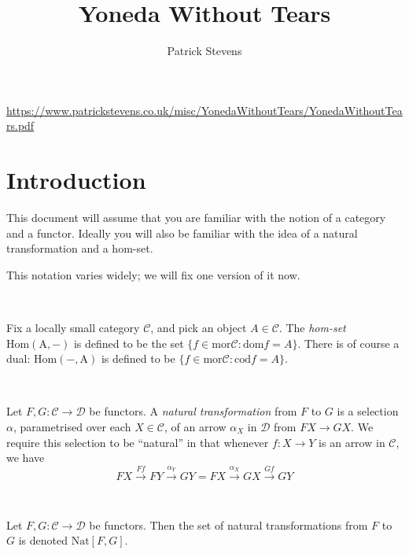 \documentclass[11pt]{amsart}
\title{Yoneda Without Tears}
\author{Patrick Stevens}
\newcommand{\homfrom}[1]{\mathrm{Hom\left(#1, -\right)}}
\newcommand{\homto}[1]{\mathrm{Hom\left(-,#1\right)}}
\newcommand{\Nat}{\mathrm{Nat}}
\begin{document}
    \maketitle

    \tiny \begin{center} \url{https://www.patrickstevens.co.uk/misc/YonedaWithoutTears/YonedaWithoutTears.pdf} \end{center}

    \normalsize

    \section{Introduction}
    This document will assume that you are familiar with the notion of a category and a functor.
    Ideally you will also be familiar with the idea of a natural transformation and a hom-set.

    This notation varies widely; we will fix one version of it now.

    \

    \begin{definition}
        Fix a locally small category $\mathcal{C}$, and pick an object $A \in \mathcal{C}$.
        The \emph{hom-set} $\homfrom{A}$ is defined to be the set $\{f \in \mathrm{mor} \mathcal{C} : \mathrm{dom} f = A\}$.
        There is of course a dual: $\homto{A}$ is defined to be $\{f \in \mathrm{mor} \mathcal{C} : \mathrm{cod} f = A\}$.
    \end{definition}

    \

    \label{defn:nattrans}
    \begin{definition}
        Let $F, G: \mathcal{C} \to \mathcal{D}$ be functors.
        A \emph{natural transformation} from $F$ to $G$ is a selection $\alpha$, parametrised over each $X \in \mathcal{C}$, of an arrow $\alpha_X$ in $\mathcal{D}$ from $FX \to GX$.
        We require this selection to be ``natural'' in that whenever $f : X \to Y$ is an arrow in $\mathcal{C}$, we have $$FX \xrightarrow{Ff} FY \xrightarrow{\alpha_Y} GY = FX \xrightarrow{\alpha_X} GX \xrightarrow{Gf} GY$$
    \end{definition}

    \

    \begin{definition}
        Let $F, G : \mathcal{C} \to \mathcal{D}$ be functors.
        Then the set of natural transformations from $F$ to $G$ is denoted $\Nat[F, G]$.
    \end{definition}
\end{document}
